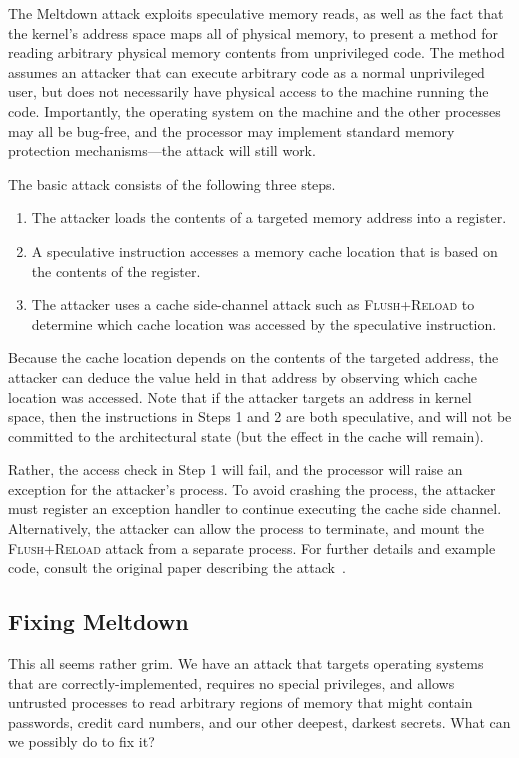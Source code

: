 \documentclass[11pt,twoside]{scrartcl}
\begin{document}
The Meltdown attack exploits speculative memory reads, as well as the fact that the kernel's address space maps all of physical memory, to present a method for reading arbitrary physical memory contents from unprivileged code. The method assumes an attacker that can execute arbitrary code as a normal unprivileged user, but does not necessarily have physical access to the machine running the code. Importantly, the operating system on the machine and the other processes may all be bug-free, and the processor may implement standard memory protection mechanisms---the attack will still work.

The basic attack consists of the following three steps.
\begin{enumerate}
\item The attacker loads the contents of a targeted memory address into a register.
\item A speculative instruction accesses a memory cache location that is based on the contents of the register.
\item The attacker uses a cache side-channel attack such as \textsc{Flush+Reload} to determine which cache location was accessed by the speculative instruction.
\end{enumerate}
Because the cache location depends on the contents of the targeted address, the attacker can deduce the value held in that address by observing which cache location was accessed. Note that if the attacker targets an address in kernel space, then the instructions in Steps 1 and 2 are both speculative, and will not be committed to the architectural state (but the effect in the cache will remain). 

Rather, the access check in Step 1 will fail, and the processor will raise an exception for the attacker's process. To avoid crashing the process, the attacker must register an exception handler to continue executing the cache side channel. Alternatively, the attacker can allow the process to terminate, and mount the \textsc{Flush+Reload} attack from a separate process. For further details and example code, consult the original paper describing the attack~\cite{Lipp18}.

\subsection{Fixing Meltdown}

This all seems rather grim. We have an attack that targets operating systems that are correctly-implemented, requires no special privileges, and allows untrusted processes to read arbitrary regions of memory that might contain passwords, credit card numbers, and our other deepest, darkest secrets. What can we possibly do to fix it?
\end{document}
